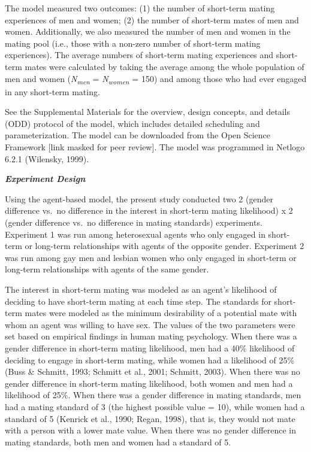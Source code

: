 \documentclass[
  12pt,
]{article}
\begin{document}
The model measured two outcomes: (1) the number of short-term mating
experiences of men and women; (2) the number of short-term mates of men
and women. Additionally, we also measured the number of men and women in
the mating pool (i.e., those with a non-zero number of short-term mating
experiences). The average numbers of short-term mating experiences and
short-term mates were calculated by taking the average among the whole
population of men and women (\emph{N\textsubscript{men}} =
\emph{N\textsubscript{women}} = 150) and among those who had ever
engaged in any short-term mating.

See the Supplemental Materials for the overview, design concepts, and
details (ODD) protocol of the model, which includes detailed scheduling
and parameterization. The model can be downloaded from the Open Science
Framework {[}link masked for peer review{]}. The model was programmed in
Netlogo 6.2.1 (Wilensky, 1999).

\textbf{\emph{Experiment Design}}

Using the agent-based model, the present study conducted two 2 (gender
difference vs.~no difference in the interest in short-term mating
likelihood) x 2 (gender difference vs.~no difference in mating
standards) experiments. Experiment 1 was run among heterosexual agents
who only engaged in short-term or long-term relationships with agents of
the opposite gender. Experiment 2 was run among gay men and lesbian
women who only engaged in short-term or long-term relationships with
agents of the same gender.

The interest in short-term mating was modeled as an agent's likelihood
of deciding to have short-term mating at each time step. The standards
for short-term mates were modeled as the minimum desirability of a
potential mate with whom an agent was willing to have sex. The values of
the two parameters were set based on empirical findings in human mating
psychology. When there was a gender difference in short-term mating
likelihood, men had a 40\% likelihood of deciding to engage in
short-term mating, while women had a likelihood of 25\% (Buss \&
Schmitt, 1993; Schmitt et al., 2001; Schmitt, 2003). When there was no
gender difference in short-term mating likelihood, both women and men
had a likelihood of 25\%. When there was a gender difference in mating
standards, men had a mating standard of 3 (the highest possible value =
10), while women had a standard of 5 (Kenrick et al., 1990; Regan,
1998), that is, they would not mate with a person with a lower mate
value. When there was no gender difference in mating standards, both men
and women had a standard of 5.
\end{document}
